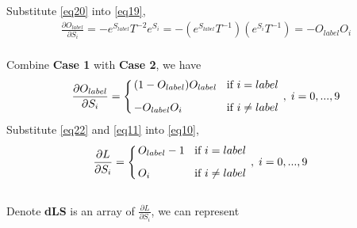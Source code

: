 \documentclass[a4paper,12pt]{article}
\newcommand*\myyellowbox[1]{%
\colorbox{myyellow}{\hspace{1em}#1\hspace{1em}}}
\begin{document}
Substitute \eqref{eq20} into \eqref{eq19}, 
\begin{equation}
\begin{aligned}
\frac{\partial{O_{label}}}{\partial{S_i}} = -e^{S_{label}}T^{-2}e^{S_i} = -(e^{S_{label}}T^{-1})(e^{S_i}T^{-1}) = -O_{label}O_i \label{eq21}
\end{aligned}
\end{equation}\\[0.5cm]
Combine \textbf{Case 1} with \textbf{Case 2}, we have
\begin{equation}
\arraycolsep=0.05cm\def\arraystretch{1.0}
\begin{aligned}
\frac{\partial{O_{label}}}{\partial{S_{i}}} = \left\{
                                                \begin{array}{ll}
                                                  (1 - O_{label})O_{label} &\thickspace\text{ if } i = label\\[0.3cm]
                                                  -O_{label}O_i &\thickspace\text{ if } i \neq label
                                                \end{array}
                                               \right. ,\thickspace i = 0, ..., 9 \label{eq22}
\end{aligned}
\end{equation}
Substitute \eqref{eq22} and \eqref{eq11} into \eqref{eq10},
\begin{equation}
\arraycolsep=0.05cm\def\arraystretch{1.0}
\begin{aligned}
\frac{\partial{L}}{\partial{S_i}} &= \left\{
                                        \begin{array}{ll}
                                          O_{label} - 1 &\thickspace\text{ if } i = label\\[0.3cm]
                                          O_i &\thickspace\text{ if } i \neq label
                                        \end{array}
                                     \right. ,\thickspace i = 0, ..., 9 \label{eq23}
\end{aligned}
\end{equation}\\[0.5cm]
Denote \textbf{dLS} is an array of $\frac{\partial{L}}{\partial{S_i}}$, we can represent
\end{document}
